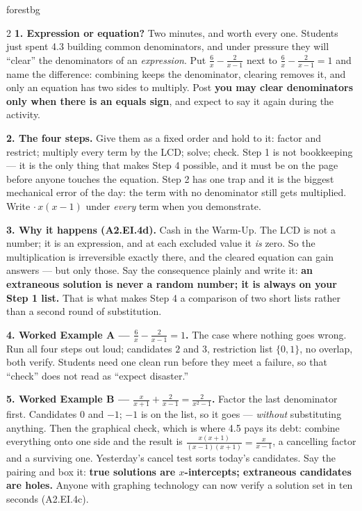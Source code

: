 \documentclass[10pt]{article}
\begin{document}
\begin{skillbox}[Lesson]{forestbg}
\begin{multicols}{2}
\textbf{1. Expression or equation?} Two minutes, and worth every one. Students just spent 4.3 building
common denominators, and under pressure they will ``clear'' the denominators of an \emph{expression}.
Put $\frac{6}{x}-\frac{2}{x-1}$ next to $\frac{6}{x}-\frac{2}{x-1}=1$ and name the difference: combining
keeps the denominator, clearing removes it, and only an equation has two sides to multiply. Post
\textbf{you may clear denominators only when there is an equals sign}, and expect to say it again during
the activity.

\textbf{2. The four steps.} Give them as a fixed order and hold to it: factor and restrict; multiply
every term by the LCD; solve; check. Step 1 is not bookkeeping --- it is the only thing that makes Step
4 possible, and it must be on the page before anyone touches the equation. Step 2 has one trap and it
is the biggest mechanical error of the day: the term with no denominator still gets multiplied. Write
$\cdot\,x(x-1)$ under \emph{every} term when you demonstrate.

\textbf{3. Why it happens (A2.EI.4d).} Cash in the Warm-Up. The LCD is not a number; it is an
expression, and at each excluded value it \emph{is} zero. So the multiplication is irreversible exactly
there, and the cleared equation can gain answers --- but only those. Say the consequence plainly and
write it: \textbf{an extraneous solution is never a random number; it is always on your Step 1 list.}
That is what makes Step 4 a comparison of two short lists rather than a second round of substitution.

\columnbreak

\textbf{4. Worked Example A --- $\frac{6}{x}-\frac{2}{x-1}=1$.} The case where nothing goes wrong. Run
all four steps out loud; candidates $2$ and $3$, restriction list $\{0,1\}$, no overlap, both verify.
Students need one clean run before they meet a failure, so that ``check'' does not read as ``expect
disaster.''

\textbf{5. Worked Example B --- $\frac{x}{x+1}+\frac{2}{x-1}=\frac{2}{x^2-1}$.} Factor the last
denominator first. Candidates $0$ and $-1$; $-1$ is on the list, so it goes --- \emph{without}
substituting anything. Then the graphical check, which is where 4.5 pays its debt: combine everything
onto one side and the result is $\frac{x(x+1)}{(x-1)(x+1)}=\frac{x}{x-1}$, a cancelling factor and a
surviving one. Yesterday's cancel test sorts today's candidates. Say the pairing and box it:
\textbf{true solutions are $x$-intercepts; extraneous candidates are holes.} Anyone with graphing
technology can now verify a solution set in ten seconds (A2.EI.4c).


\end{multicols}
\end{skillbox}
\end{document}
